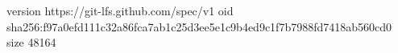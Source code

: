 version https://git-lfs.github.com/spec/v1
oid sha256:f97a0efd111c32a86fca7ab1c25d3ee5e1c9b4ed9c1f7b7988fd7418ab560cd0
size 48164
